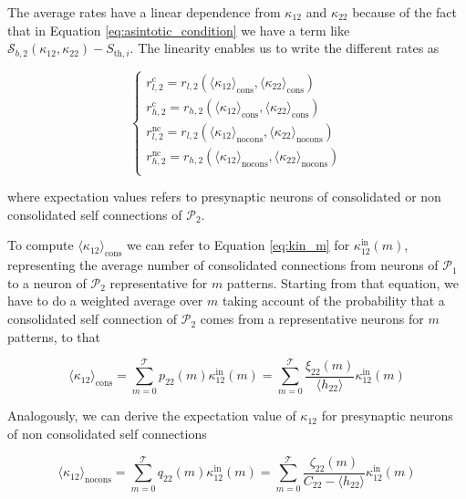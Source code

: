 \documentclass[a4paper, 12pt, twoside, openright]{book}
\newcommand{\popI}{\mathcal{P}_1}
\newcommand{\popII}{\mathcal{P}_2}
\newcommand{\T}{\mathcal{T}}
\begin{document}
The average rates have a linear dependence from $\kappa_{12}$ and $\kappa_{22}$ because of the fact that in Equation \eqref{eq:asintotic_condition} we have a term like $\mathcal{S}_{b,2}(\kappa_{12},\kappa_{22}) - S_{\text{th},i}$. The linearity enables us to write the different rates as

\begin{equation}
\begin{cases}
    r_{l,2}^{\text{c}}  =   
        r_{l,2} (\langle \kappa_{12} {\rangle}_\text{cons},
        \langle \kappa_{22} {\rangle}_\text{cons}) \\
    r_{h,2}^{\text{c}}  =
        r_{h,2} (\langle \kappa_{12} {\rangle}_\text{cons},
        \langle \kappa_{22} {\rangle}_\text{cons})  \\
    r_{l,2}^{\text{nc}}  =
        r_{l,2} (\langle \kappa_{12} {\rangle}_\text{nocons},
        \langle \kappa_{22} {\rangle}_\text{nocons}) \\
    r_{h,2}^{\text{nc}}  =
        r_{h,2} (\langle \kappa_{12} {\rangle}_\text{nocons},
        \langle \kappa_{22} {\rangle}_\text{nocons})  \\
\end{cases}
\end{equation}

where expectation values refers to presynaptic neurons of consolidated or non consolidated self connections of $\popII$.


To compute $\langle \kappa_{12}{\rangle}_\text{cons}$ we can refer to Equation \eqref{eq:kin_m} for 
$\kappa_{12}^\text{in}(m)$,
representing the average number of consolidated connections from neurons of $\popI$ to a neuron of $\popII$ representative for $m$ patterns. Starting from that equation, we have to do a weighted average over $m$ taking account of the probability that a consolidated self connection of $\popII$ comes from a representative neurons for $m$ patterns, to that

\begin{equation}
    \langle \kappa_{12} \rangle_{\text{cons}} = \sum_{m=0}^{\T} p_{22}(m)
    \kappa_{12}^\text{in}(m)
    = \sum_{m=0}^{\T} \frac{\xi_{22}(m)}{\langle h_{22} \rangle}
    \kappa_{12}^\text{in}(m)
\end{equation}

Analogously, we can derive the expectation value of $\kappa_{12}$ for presynaptic neurons of non consolidated self connections

\begin{equation}
    \langle \kappa_{12} \rangle_{\text{nocons}} =  \sum_{m=0}^{\T} q_{22}(m)
    \kappa_{12}^\text{in}(m)
    = \sum_{m=0}^{\T} \frac{\zeta_{22}(m)}{C_{22} -\langle h_{22} \rangle}
    \kappa_{12}^\text{in}(m)
\end{equation}
\end{document}
